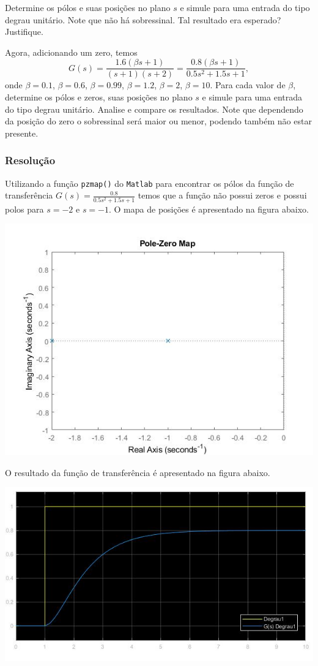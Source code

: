 \documentclass[
]{book}
\begin{document}
Determine os pólos e suas posições no plano \(s\) e simule para uma entrada do tipo degrau unitário. Note que não há sobressinal. Tal resultado era esperado? Justifique.

Agora, adicionando um zero, temos
\[
G(s) = \frac {1.6(\beta s+1)}{(s+1)(s+2)} = \frac {0.8(\beta s+1)}{0.5s^2 +1.5s +1},
\]
onde \(\beta = 0.1\), \(\beta = 0.6\), \(\beta = 0.99\), \(\beta = 1.2\), \(\beta = 2\), \(\beta = 10\). Para cada valor de \(\beta\), determine os pólos e zeros, suas posições no plano \(s\) e simule para uma entrada do tipo degrau unitário. Analise e compare os resultados. Note que dependendo da posição do zero o sobressinal será maior ou menor, podendo também não estar presente.

\hypertarget{resoluuxe7uxe3o-3}{%
\subsubsection*{Resolução}\label{resoluuxe7uxe3o-3}}

Utilizando a função \texttt{pzmap()} do \texttt{Matlab} para encontrar os pólos da função de transferência \(G(s) = \frac {0.8}{0.5s^2+1.5s+1}\) temos que a função não possui zeros e possui polos para \(s = -2\) e \(s = -1\). O mapa de posições é apresentado na figura abaixo.

\includegraphics{Imagens/Lab2/prob4.jpg}

O resultado da função de transferência é apresentado na figura abaixo.

\includegraphics{imagens/Lab2/prob41.jpg}
\end{document}
